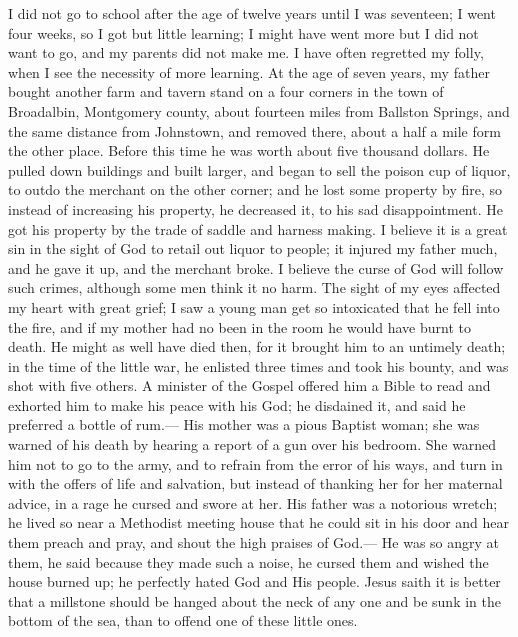 \documentclass{article}
\renewcommand\footnote[1]{} %
\begin{document}
I did not go to school after the age of twelve years until I was seventeen\footnote{between 1813--1818}; I went four weeks, so I got but little learning; I might have went more but I did not want to go, and my parents did not make me.
I have often regretted my folly, when I see the necessity of more learning.
At the age of seven years\footnote{in the year 1808}, my father bought another farm and tavern stand on a four corners in the town of Broadalbin, Montgomery county\footnote{now Fulton County}, about fourteen miles\footnote{18.0 miles} from Ballston Springs\footnote{incorporation as the village of of Ballston Spa in 1807}, and the same distance from Johnstown\footnote{9.4 miles}, and removed there, about a half a mile form the other place.
Before this time he was worth about five thousand dollars.
He pulled down buildings and built larger, and began to sell the poison cup of liquor, to outdo the merchant on the other corner; and he lost some property by fire, so instead of increasing his property, he decreased it, to his sad disappointment.
He got his property by the trade of saddle and harness making.
I believe it is a great sin in the sight of God to retail out liquor to people; it injured my father much, and he gave it up, and the merchant broke.
I believe the curse of God will follow such crimes, although some men think it no harm.
The sight of my eyes affected my heart with great grief; I saw a young man get so intoxicated that he fell into the fire, and if my mother had no been in the room he would have burnt to death.
He might as well have died then, for it brought him to an untimely death; in the time of the little war, he enlisted three times and took his bounty, and was shot with five others.
A minister of the Gospel offered him a Bible to read and exhorted him to make his peace with his God; he disdained it, and said he preferred a bottle of rum.---
His mother was a pious Baptist woman; she was warned of his death by hearing a report of a gun over his bedroom.
She warned him not to go to the army, and to refrain from the error of his ways, and turn in with the offers of life and salvation, but instead of thanking her for her maternal advice, in a rage he cursed and swore at her.
His father was a notorious wretch; he lived so near a Methodist meeting house that he could sit in his door and hear them preach and pray, and shout the high praises of God.---
He was so angry at them, he said because they made such a noise, he cursed them and wished the house burned up; he perfectly hated God and His people.
Jesus saith it is better that a millstone should be hanged about the neck of any one and be sunk in the bottom of the sea, than to offend one of these little ones.
\end{document}

